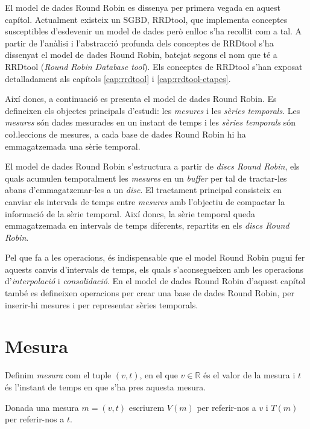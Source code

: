 El model de dades Round Robin es dissenya per primera vegada en aquest capítol. 
Actualment existeix un SGBD, RRDtool, que implementa conceptes susceptibles d'esdevenir un model de dades però enlloc s'ha recollit com a tal. A partir de l'anàlisi i l'abstracció profunda dels conceptes de RRDtool s'ha dissenyat el model de dades Round Robin, batejat segons el nom que té a RRDtool (\emph{Round Robin Database tool}). Els conceptes de RRDtool s'han exposat detalladament als capítols \ref{cap:rrdtool} i \ref{cap:rrdtool-etapes}. 


Així doncs, a continuació es presenta el model de dades Round Robin. 
Es defineixen els objectes principals d'estudi: les \emph{mesures} i les \emph{sèries temporals}. Les \emph{mesures} són dades mesurades en un instant de temps i les \emph{sèries temporals} són co\l.leccions de mesures, a cada base de dades Round Robin hi ha emmagatzemada una sèrie temporal. 

El model de dades Round Robin s'estructura a partir de \emph{discs Round Robin}, els quals  acumulen temporalment les \emph{mesures} en un \emph{buffer} per tal de tractar-les abans d'emmagatzemar-les  a un \emph{disc}. El tractament principal consisteix en canviar els intervals de temps entre \emph{mesures} amb l'objectiu de compactar la informació de la sèrie temporal.
Així doncs, la sèrie temporal queda emmagatzemada en intervals de temps diferents, repartits en els \emph{discs Round Robin}. 

Pel que fa a les operacions, és indispensable que el model Round Robin pugui fer aquests canvis d'intervals de temps, els quals s'aconsegueixen amb les operacions d'\emph{interpolació} i \emph{consolidació}. En el model de dades Round Robin d'aquest capítol també es defineixen operacions per crear una base de dades Round Robin, per inserir-hi mesures i per representar sèries temporals.




\section{Mesura}\label{sec:model:mesura} 

\begin{definition}[Mesura]
  \label{def:mesura}
  Definim \emph{mesura} com el tuple $(v,t)$, en el que
  $v\in\mathbb{R}$ és el valor de la mesura i $t$ és l'instant de
  temps en que s'ha pres aquesta mesura.
\end{definition}

Donada una mesura $m=(v,t)$ escriurem $V(m)$ per referir-nos a $v$ i
$T(m)$ per referir-nos a $t$.


